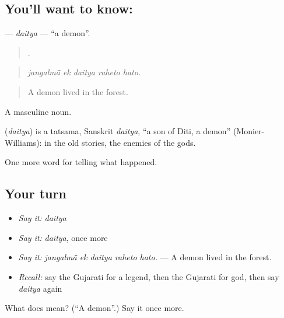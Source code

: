 \subsection*{You'll want to know: }
\textbf{} — \emph{daitya} — \textquotedblleft{}a demon\textquotedblright{}.

\begin{quote}
    .
\end{quote}

\begin{quote}
\emph{jangalmā̃ ek daitya raheto hato.}
\end{quote}

\begin{quote}
A demon lived in the forest.
\end{quote}

A masculine noun.

\begin{cousinweb}
\textbf{} (\emph{daitya}) is a tatsama, Sanskrit \emph{daitya}, \textquotedblleft{}a son of Diti, a demon\textquotedblright{} (Monier-Williams): in the old stories, the enemies of the gods.
\end{cousinweb}

\begin{grammarlens}[title={What you've built}]
One more word for telling what happened.
\end{grammarlens}

\subsection*{Your turn}
\begin{itemize}
\raggedright
  \item \emph{Say it:} \emph{daitya}
  \item \emph{Say it:} \emph{daitya}, once more
  \item \emph{Say it:} \emph{jangalmā̃ ek daitya raheto hato.} — A demon lived in the forest.
  \item \emph{Recall:} say the Gujarati for a legend, then the Gujarati for god, then say \emph{daitya} again
\end{itemize}

\begin{tcolorbox}[breakable,colback=teal!4,colframe=teal!35!black,title={Before you move on}]
What does  mean? (\textquotedblleft{}A demon\textquotedblright{}.) Say it once more.
\end{tcolorbox}

